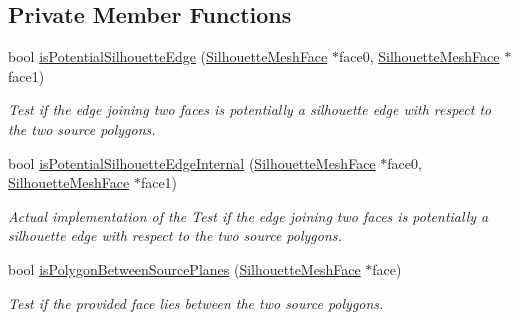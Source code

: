 \subsection*{Private Member Functions}
\begin{DoxyCompactItemize}
\item 
\mbox{\label{classvisilib_1_1_silhouette_processor_a860d7b7a18d3b97ff8a87234dc13fb53}} 
bool \mbox{\hyperlink{classvisilib_1_1_silhouette_processor_a860d7b7a18d3b97ff8a87234dc13fb53}{is\+Potential\+Silhouette\+Edge}} (\mbox{\hyperlink{classvisilib_1_1_silhouette_mesh_face}{Silhouette\+Mesh\+Face}} $\ast$face0, \mbox{\hyperlink{classvisilib_1_1_silhouette_mesh_face}{Silhouette\+Mesh\+Face}} $\ast$face1)
\begin{DoxyCompactList}\small\item\em Test if the edge joining two faces is potentially a silhouette edge with respect to the two source polygons. \end{DoxyCompactList}\item 
\mbox{\label{classvisilib_1_1_silhouette_processor_a802ca9581c1496e8904ea4dc81ea12e4}} 
bool \mbox{\hyperlink{classvisilib_1_1_silhouette_processor_a802ca9581c1496e8904ea4dc81ea12e4}{is\+Potential\+Silhouette\+Edge\+Internal}} (\mbox{\hyperlink{classvisilib_1_1_silhouette_mesh_face}{Silhouette\+Mesh\+Face}} $\ast$face0, \mbox{\hyperlink{classvisilib_1_1_silhouette_mesh_face}{Silhouette\+Mesh\+Face}} $\ast$face1)
\begin{DoxyCompactList}\small\item\em Actual implementation of the Test if the edge joining two faces is potentially a silhouette edge with respect to the two source polygons. \end{DoxyCompactList}\item 
\mbox{\label{classvisilib_1_1_silhouette_processor_a0b85bda058a2412f2abfab105af75a64}} 
bool \mbox{\hyperlink{classvisilib_1_1_silhouette_processor_a0b85bda058a2412f2abfab105af75a64}{is\+Polygon\+Between\+Source\+Planes}} (\mbox{\hyperlink{classvisilib_1_1_silhouette_mesh_face}{Silhouette\+Mesh\+Face}} $\ast$face)
\begin{DoxyCompactList}\small\item\em Test if the provided face lies between the two source polygons. \end{DoxyCompactList}\item 

\end{DoxyCompactItemize}
